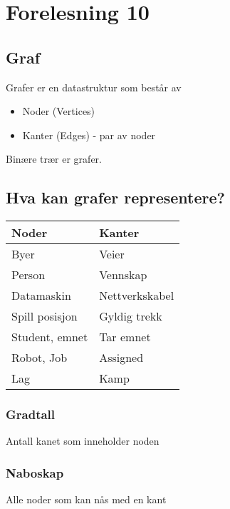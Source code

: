 \documentclass{article}
\begin{document}
    \section{Forelesning 10}

    \subsection{Graf}
    Grafer er en datastruktur som består av
    \begin{itemize}
        \item Noder (Vertices)
        \item Kanter (Edges) - par av noder
    \end{itemize}

    Binære trær er grafer.

    \subsection{Hva kan grafer representere?}
    \begin{table}[H]
        \begin{center}
            \begin{tabular}[c]{|l|l|}
                \hline
                 \textbf{Noder}&\textbf{Kanter}  \\
                \hline
                 Byer& Veier  \\
                 Person& Vennskap  \\
                 Datamaskin& Nettverkskabel  \\
                 Spill posisjon& Gyldig trekk  \\
                 Student, emnet& Tar emnet  \\
                 Robot, Job& Assigned  \\
                 Lag& Kamp  \\
                \hline
            \end{tabular}
        \end{center}
    \end{table}

    \subsubsection{Gradtall}
    Antall kanet som inneholder noden

    \subsubsection{Naboskap}
    Alle noder som kan nås med en kant
\end{document}
